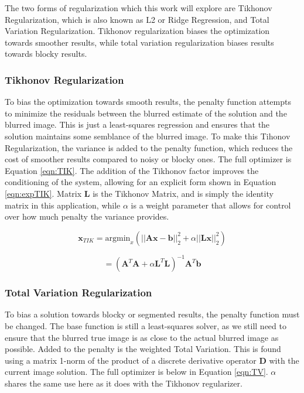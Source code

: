 \documentclass[letterpaper, 10pt, titlepage, twocolumn]{article}
\begin{document}
The two forms of regularization which this work will explore are Tikhonov Regularization, which is also known as L2 or Ridge Regression, and Total Variation Regularization. Tikhonov regularization biases the optimization towards smoother results, while total variation regularization biases results towards blocky results.

\subsubsection*{Tikhonov Regularization}
To bias the optimization towards smooth results, the penalty function attempts to minimize the residuals between the blurred estimate of the solution and the blurred image. This is just a least-squares regression and ensures that the solution maintains some semblance of the blurred image. To make this Tihonov Regularization, the variance is added to the penalty function, which reduces the cost of smoother results compared to noisy or blocky ones. The full optimizer is Equation \eqref{eqn:TIK}. The addition of the Tikhonov factor improves the conditioning of the system, allowing for an explicit form shown in Equation \eqref{eqn:expTIK}. Matrix \textbf{L} is the Tikhonov Matrix, and is simply the identity matrix in this application, while $\alpha$ is a weight parameter that allows for control over how much penalty the variance provides.

\begin{equation}
  \label{eqn:TIK}
  \mathbf{x}_{TIK} = \textrm{argmin}_x\left(||\mathbf{Ax}-\mathbf{b}||^2_2 + \alpha||\mathbf{Lx}||^2_2\right)
\end{equation}

\begin{equation}
  \label{eqn:expTIK}
  = \left(\mathbf{A}^T\mathbf{A} + \alpha \mathbf{L}^T\mathbf{L}\right)^{-1}\mathbf{A}^T\mathbf{b}
\end{equation}

\subsubsection*{Total Variation Regularization}
To bias a solution towards blocky or segmented results, the penalty function must be changed. The base function is still a least-squares solver, as we still need to ensure that the blurred true image is as close to the actual blurred image as possible. Added to the penalty is the weighted Total Variation. This is found using a matrix 1-norm of the product of a discrete derivative operator \textbf{D} with the current image solution. The full optimizer is below in Equation \eqref{eqn:TV}. $\alpha$ shares the same use here as it does with the Tikhonov regularizer.
\end{document}
